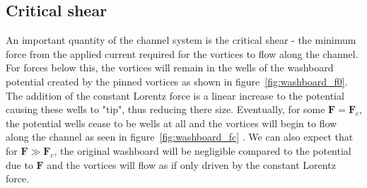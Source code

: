 \documentclass{article}
\numberwithin{equation}{section}
\begin{document}
\subsection{Critical shear}
An important quantity of the channel system is the critical shear - the minimum force from the applied current required for the vortices to flow along the channel. For forces below this, the vortices will remain in the wells of the washboard potential created by the pinned vortices as shown in figure~\ref{fig:washboard_f0}. The addition of the constant Lorentz force is a linear increase to the potential causing these wells to "tip", thus reducing there size. Eventually, for some $\mathbf{F}=\mathbf{F}_c$, the potential wells cease to be wells at all and the vortices will begin to flow along the channel as seen in figure~\ref{fig:washboard_fc} \cite{Gartlan2020NovelFibres, Watkins2016DensitySuperconductors}. We can also expect that for $\mathbf{F}\gg\mathbf{F}_c$, the original washboard will be negligible compared to the potential due to $\mathbf{F}$ and the vortices will flow as if only driven by the constant Lorentz force.
\end{document}
